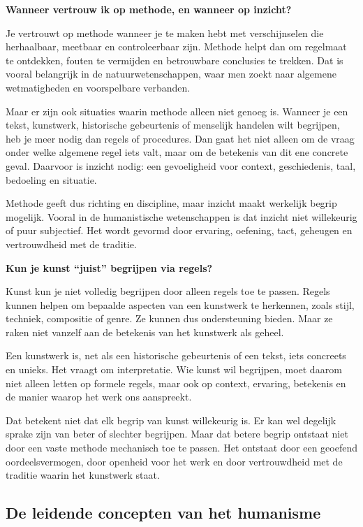 \documentclass[11pt,twoside,openright]{memoir}
\begin{document}
\bigskip
\noindent
\textbf{Wanneer vertrouw ik op methode, en wanneer op inzicht?}
\medskip

Je vertrouwt op methode wanneer je te maken hebt met verschijnselen die herhaalbaar, meetbaar en controleerbaar zijn. Methode helpt dan om regelmaat te ontdekken, fouten te vermijden en betrouwbare conclusies te trekken. Dat is vooral belangrijk in de natuurwetenschappen, waar men zoekt naar algemene wetmatigheden en voorspelbare verbanden.

Maar er zijn ook situaties waarin methode alleen niet genoeg is. Wanneer je een tekst, kunstwerk, historische gebeurtenis of menselijk handelen wilt begrijpen, heb je meer nodig dan regels of procedures. Dan gaat het niet alleen om de vraag onder welke algemene regel iets valt, maar om de betekenis van dit ene concrete geval. Daarvoor is inzicht nodig: een gevoeligheid voor context, geschiedenis, taal, bedoeling en situatie.

Methode geeft dus richting en discipline, maar inzicht maakt werkelijk begrip mogelijk. Vooral in de humanistische wetenschappen is dat inzicht niet willekeurig of puur subjectief. Het wordt gevormd door ervaring, oefening, tact, geheugen en vertrouwdheid met de traditie.

\bigskip
\noindent
\textbf{Kun je kunst ``juist'' begrijpen via regels?}
\medskip

Kunst kun je niet volledig begrijpen door alleen regels toe te passen. Regels kunnen helpen om bepaalde aspecten van een kunstwerk te herkennen, zoals stijl, techniek, compositie of genre. Ze kunnen dus ondersteuning bieden. Maar ze raken niet vanzelf aan de betekenis van het kunstwerk als geheel.

Een kunstwerk is, net als een historische gebeurtenis of een tekst, iets concreets en unieks. Het vraagt om interpretatie. Wie kunst wil begrijpen, moet daarom niet alleen letten op formele regels, maar ook op context, ervaring, betekenis en de manier waarop het werk ons aanspreekt.

Dat betekent niet dat elk begrip van kunst willekeurig is. Er kan wel degelijk sprake zijn van beter of slechter begrijpen. Maar dat betere begrip ontstaat niet door een vaste methode mechanisch toe te passen. Het ontstaat door een geoefend oordeelsvermogen, door openheid voor het werk en door vertrouwdheid met de traditie waarin het kunstwerk staat.

\subsection{De leidende concepten van het humanisme}
\end{document}
